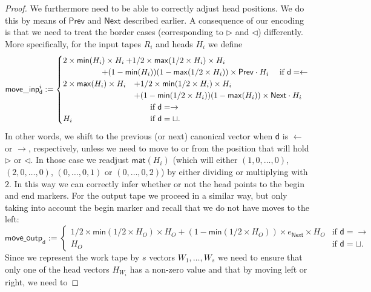 \begin{proof}
    We furthermore need to be able to correctly adjust head positions. We do this by means of $\mathsf{Prev}$ and $\mathsf{Next}$
	described earlier.
    A consequence of our encoding is that we need to treat the border cases (corresponding to $\rhd$ and 
    $\lhd$) differently. More specifically, for the input tapes $R_i$ and heads $H_i$ we define 
    $$
    \mathsf{move\_inp}^i_{\mathsf{d}}:=
    \begin{cases}
    2\times \mathsf{min}(H_i)\times H_i &\!\!\!\!\!\!+ 1/2\times\mathsf{max}(1/2\times H_i)\times H_i \\
    & \hspace{-4em}+(1-\mathsf{min}(H_i))(1-\mathsf{max}(1/2 \times H_i))\times \mathsf{Prev}\cdot H_i \quad \text{ if $\mathsf{d}=\leftarrow$}\\
    2\times \mathsf{max}(H_i)\times H_i & + 1/2\times\mathsf{min}(1/2\times H_i)\times H_i \\
    & + (1-\mathsf{min}(1/2\times H_i))(1-\mathsf{max}(H_i))\times \mathsf{Next}\cdot H_i  \\
    &\hspace{2em}\text{if $\mathsf{d}=\rightarrow$}\\
    H_i & \hspace{2em}\text{if $\mathsf{d}=\sqcup$}. 
    \end{cases}
    $$
    In other words, we shift to the previous (or next) canonical vector when $\mathsf{d}$ is $\leftarrow$ 
    or $\rightarrow$, respectively, unless we need to move to or from the position that will hold $\rhd$ 
    or $\lhd$. In those case we readjust $\mathsf{mat}(H_i)$ (which will either $(1,0,\ldots,0)$, $(2,0,\ldots,0)$, 
    $(0,\ldots,0,1)$ or $(0,\ldots,0,2)$) by either dividing or multiplying with $2$. In this way we can 
    correctly infer whether or not the head points to the begin and end markers. For the output tape we 
    proceed in a similar way, but only taking into account the begin marker and recall that we do not have 
    moves to the left:
    $$
    \mathsf{move\_outp}_{\mathsf{d}}:=
    \begin{cases}
    1/2\times\mathsf{min}(1/2\times H_O)\times H_O  + (1-\mathsf{min}(1/2\times H_O))\times e_{\mathsf{Next}}\times H_O  
    & \text{if $\mathsf{d}=\rightarrow$}\\
    H_O & \text{if $\mathsf{d}=\sqcup$}. 
    \end{cases}
    $$
    Since we represent the work tape by $s$ vectors $W_1,\ldots,W_s$ we need to ensure that only one 
    of the head vectors $H_{W_i}$ has a non-zero value and that by moving left or right, we need to 

\end{proof}
